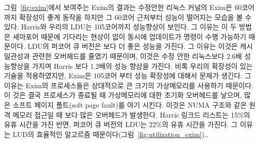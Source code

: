 그림~\ref{fig:exim}에서 보여주는 Exim의 결과는 수정안한 리눅스 커널의 Exim은
 60코어 까지 확장성이 좋게 동작을 하지만 그 60코어 근처부터 성능이 떨어지는 모습을 볼 수 있다. 
Harris와 우리의 LDU는 105코어까지 성능향상이 보인다. 그 이유는 이 두 방법은 세마포어 때문에 
기다리는 현상이 없이 동시에 업데이트가 명령이 수행 가능하기 때문이다. 
LDU의 퍼코어 큐 버전은 보다 더 좋은 성능을 가진다.
그 이유는 이것은 캐시 일관성과 관련한 오버헤드를 줄였기 때문이며, 이것은 수정 안한 리눅스보다 2.6배 성능향상을
 가지며 Harris 보다 1.2배의 성능 향상을 가진다. 
비록 우리의 확장성이 있는 기술을 적용하였지만, Exim은 105코어 부터 성능 확장성에 대해서 문제가 생긴다.
그 이유는 Exim의 프로세스들은 상대적으로 큰 크기의 가상메모리를 사용하기 때문이다.
 이 것은 결국 프로세스가 종료될 때 가상메모리에 대한 초기화 오버헤드를 낳으며,
  많은 소프트 페이지 폴트(soft page fault)를 야기 시킨다. 이것은 NUMA 구조와 같은 원격 메모리 접근일 때 
  보다 많은 오버헤드가 발생한다. 
Harris 링크드 리스트는 15\%의 유휴 시간을 가진 반면, 퍼코어 큐 버전의 LDU는 22\%의 유휴 시간을 가진다.
그 이유는 LUD의 효율적인 알고르즘 때문이다(그림~\ref{fig:utilization_exim})..

